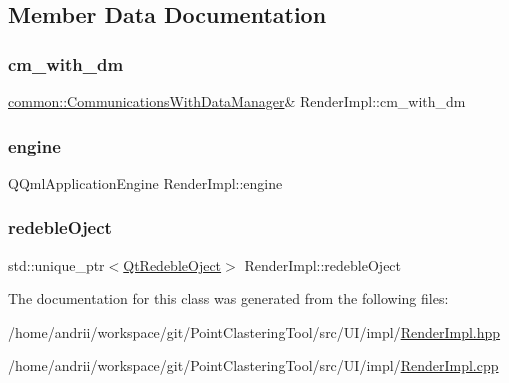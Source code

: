 \subsection{Member Data Documentation}
\mbox{\label{classRenderImpl_ad1fb1f788f5b06cc60d6f946ccc44273}} 
\subsubsection{\texorpdfstring{cm\+\_\+with\+\_\+dm}{cm\_with\_dm}}
{\footnotesize\ttfamily \mbox{\hyperlink{classcommon_1_1CommunicationsWithDataManager}{common\+::\+Communications\+With\+Data\+Manager}}\& Render\+Impl\+::cm\+\_\+with\+\_\+dm\hspace{0.3cm}{\ttfamily [private]}}

\mbox{\label{classRenderImpl_a8ccd71e00c0f76702d9bb0f0e40a1ccb}} 
\subsubsection{\texorpdfstring{engine}{engine}}
{\footnotesize\ttfamily Q\+Qml\+Application\+Engine Render\+Impl\+::engine\hspace{0.3cm}{\ttfamily [private]}}

\mbox{\label{classRenderImpl_a40cf893cd17cc6c94072ce79fc765bf1}} 
\subsubsection{\texorpdfstring{redeble\+Oject}{redebleOject}}
{\footnotesize\ttfamily std\+::unique\+\_\+ptr$<$\mbox{\hyperlink{classQtRedebleOject}{Qt\+Redeble\+Oject}}$>$ Render\+Impl\+::redeble\+Oject\hspace{0.3cm}{\ttfamily [private]}}



The documentation for this class was generated from the following files\+:\begin{DoxyCompactItemize}
\item 
/home/andrii/workspace/git/\+Point\+Clastering\+Tool/src/\+U\+I/impl/\mbox{\hyperlink{RenderImpl_8hpp}{Render\+Impl.\+hpp}}\item 
/home/andrii/workspace/git/\+Point\+Clastering\+Tool/src/\+U\+I/impl/\mbox{\hyperlink{RenderImpl_8cpp}{Render\+Impl.\+cpp}}\end{DoxyCompactItemize}
